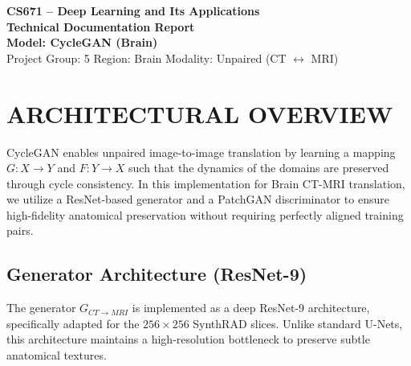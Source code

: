 \documentclass[10pt,a4paper]{article}
\begin{document}
\begin{tcolorbox}[
  enhanced,
  colback=softbg,
  colframe=brand,
  boxrule=0.9pt,
  arc=2mm,
  left=5pt,right=5pt,top=5pt,bottom=5pt
]
\centering
{\Large\bfseries\color{brand} CS671 -- Deep Learning and Its Applications}\\[2pt]
{\large\bfseries Technical Documentation Report}\\[6pt]
{\normalsize\bfseries Model: CycleGAN (Brain)}\\[4pt]
\small
Project Group: 5 \quad Region: Brain \quad Modality: Unpaired (CT $\leftrightarrow$ MRI)
\end{tcolorbox}

\section{ARCHITECTURAL OVERVIEW}
CycleGAN enables unpaired image-to-image translation by learning a mapping $G: X \to Y$ and $F: Y \to X$ such that the dynamics of the domains are preserved through cycle consistency. In this implementation for Brain CT-MRI translation, we utilize a ResNet-based generator and a PatchGAN discriminator to ensure high-fidelity anatomical preservation without requiring perfectly aligned training pairs.

\subsection{Generator Architecture (ResNet-9)}
The generator $G_{CT \to MRI}$ is implemented as a deep ResNet-9 architecture, specifically adapted for the $256 \times 256$ SynthRAD slices. Unlike standard U-Nets, this architecture maintains a high-resolution bottleneck to preserve subtle anatomical textures.
\end{document}
